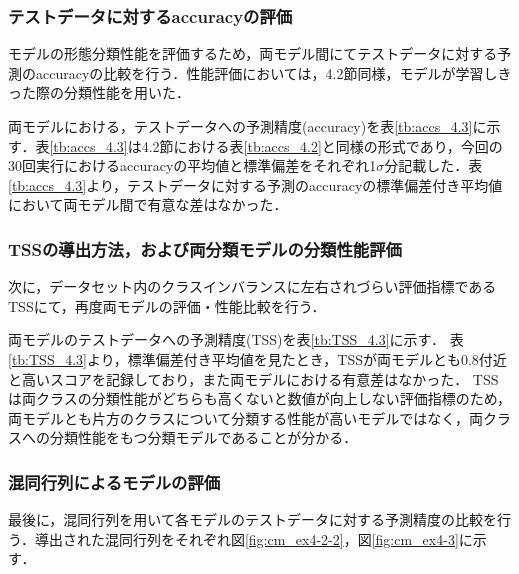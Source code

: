 \documentclass[a4j, 11pt]{jreport}
\begin{document}

\subsubsection{テストデータに対するaccuracyの評価}
モデルの形態分類性能を評価するため，両モデル間にてテストデータに対する予測のaccuracyの比較を行う．性能評価においては，4.2節同様，モデルが学習しきった際の分類性能を用いた．

両モデルにおける，テストデータへの予測精度(accuracy)を表\ref{tb:accs_4.3}に示す．表\ref{tb:accs_4.3}は4.2節における表\ref{tb:accs_4.2}と同様の形式であり，今回の30回実行におけるaccuracyの平均値と標準偏差をそれぞれ1$\sigma$分記載した．表\ref{tb:accs_4.3}より，テストデータに対する予測のaccuracyの標準偏差付き平均値において両モデル間で有意な差はなかった．

\subsubsection{TSSの導出方法，および両分類モデルの分類性能評価}
次に，データセット内のクラスインバランスに左右されづらい評価指標であるTSSにて，再度両モデルの評価・性能比較を行う．


両モデルのテストデータへの予測精度(TSS)を表\ref{tb:TSS_4.3}に示す．
表\ref{tb:TSS_4.3}より，標準偏差付き平均値を見たとき，TSSが両モデルとも0.8付近と高いスコアを記録しており，また両モデルにおける有意差はなかった．
TSSは両クラスの分類性能がどちらも高くないと数値が向上しない評価指標のため，
両モデルとも片方のクラスについて分類する性能が高いモデルではなく，両クラスへの分類性能をもつ分類モデルであることが分かる．

\subsubsection{混同行列によるモデルの評価}
最後に，混同行列を用いて各モデルのテストデータに対する予測精度の比較を行う．導出された混同行列をそれぞれ図\ref{fig:cm_ex4-2-2}，図\ref{fig:cm_ex4-3}に示す．
\end{document}

